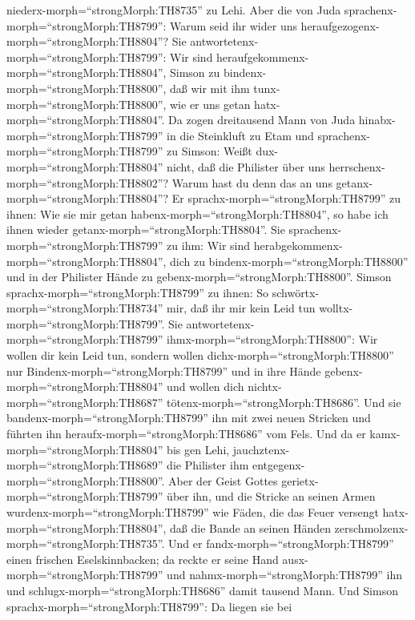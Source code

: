 niederx-morph=``strongMorph:TH8735'' zu Lehi.  Aber die von
Juda sprachenx-morph=``strongMorph:TH8799'': Warum seid ihr wider uns
heraufgezogenx-morph=``strongMorph:TH8804''? Sie
antwortetenx-morph=``strongMorph:TH8799'': Wir sind
heraufgekommenx-morph=``strongMorph:TH8804'', Simson zu
bindenx-morph=``strongMorph:TH8800'', daß wir mit ihm
tunx-morph=``strongMorph:TH8800'', wie er uns getan
hatx-morph=``strongMorph:TH8804''.  Da zogen dreitausend
Mann von Juda hinabx-morph=``strongMorph:TH8799'' in die Steinkluft zu
Etam und sprachenx-morph=``strongMorph:TH8799'' zu Simson: Weißt
dux-morph=``strongMorph:TH8804'' nicht, daß die Philister über uns
herrschenx-morph=``strongMorph:TH8802''? Warum hast du denn das an uns
getanx-morph=``strongMorph:TH8804''? Er
sprachx-morph=``strongMorph:TH8799'' zu ihnen: Wie sie mir getan
habenx-morph=``strongMorph:TH8804'', so habe ich ihnen wieder
getanx-morph=``strongMorph:TH8804''.  Sie
sprachenx-morph=``strongMorph:TH8799'' zu ihm: Wir sind
herabgekommenx-morph=``strongMorph:TH8804'', dich zu
bindenx-morph=``strongMorph:TH8800'' und in der Philister Hände zu
gebenx-morph=``strongMorph:TH8800''. Simson
sprachx-morph=``strongMorph:TH8799'' zu ihnen: So
schwörtx-morph=``strongMorph:TH8734'' mir, daß ihr mir kein Leid tun
wolltx-morph=``strongMorph:TH8799''.  Sie
antwortetenx-morph=``strongMorph:TH8799''
ihmx-morph=``strongMorph:TH8800'': Wir wollen dir kein Leid tun, sondern
wollen dichx-morph=``strongMorph:TH8800'' nur
Bindenx-morph=``strongMorph:TH8799'' und in ihre Hände
gebenx-morph=``strongMorph:TH8804'' und wollen dich
nichtx-morph=``strongMorph:TH8687'' tötenx-morph=``strongMorph:TH8686''.
Und sie bandenx-morph=``strongMorph:TH8799'' ihn mit zwei neuen Stricken
und führten ihn heraufx-morph=``strongMorph:TH8686'' vom Fels.
 Und da er kamx-morph=``strongMorph:TH8804'' bis gen Lehi,
jauchztenx-morph=``strongMorph:TH8689'' die Philister ihm
entgegenx-morph=``strongMorph:TH8800''. Aber der Geist Gottes
gerietx-morph=``strongMorph:TH8799'' über ihn, und die Stricke an seinen
Armen wurdenx-morph=``strongMorph:TH8799'' wie Fäden, die das Feuer
versengt hatx-morph=``strongMorph:TH8804'', daß die Bande an seinen
Händen zerschmolzenx-morph=``strongMorph:TH8735''.  Und er
fandx-morph=``strongMorph:TH8799'' einen frischen Eselskinnbacken; da
reckte er seine Hand ausx-morph=``strongMorph:TH8799'' und
nahmx-morph=``strongMorph:TH8799'' ihn und
schlugx-morph=``strongMorph:TH8686'' damit tausend Mann. 
Und Simson sprachx-morph=``strongMorph:TH8799'': Da liegen sie bei
